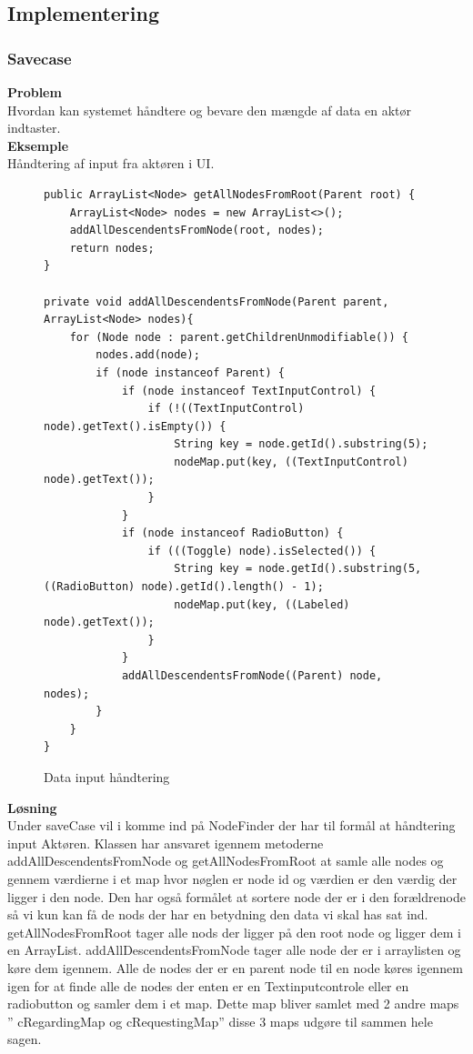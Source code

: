 \subsection{Implementering}
\subsubsection{Savecase}
\textbf{Problem}\\
Hvordan kan systemet håndtere og bevare den mængde af data en aktør indtaster.\\
\textbf{Eksemple} \\
Håndtering af input fra aktøren i UI. \\
\begin{figure} [hbt!]
\begin{lstlisting}
public ArrayList<Node> getAllNodesFromRoot(Parent root) {
	ArrayList<Node> nodes = new ArrayList<>();
	addAllDescendentsFromNode(root, nodes);
	return nodes;
}
    
private void addAllDescendentsFromNode(Parent parent, ArrayList<Node> nodes){
	for (Node node : parent.getChildrenUnmodifiable()) {
		nodes.add(node);
		if (node instanceof Parent) {
			if (node instanceof TextInputControl) {
				if (!((TextInputControl) node).getText().isEmpty()) {
					String key = node.getId().substring(5);
					nodeMap.put(key, ((TextInputControl) node).getText());
				}
			}
			if (node instanceof RadioButton) {
				if (((Toggle) node).isSelected()) {
					String key = node.getId().substring(5,((RadioButton) node).getId().length() - 1);
					nodeMap.put(key, ((Labeled) node).getText());
				}
			}
			addAllDescendentsFromNode((Parent) node, nodes);
		}
    }
}
\end{lstlisting}
\caption{Data input håndtering}
\label{kode:nodes}
\end{figure}
\textbf{Løsning }\\
Under saveCase vil i komme ind på NodeFinder der har til formål at håndtering input Aktøren. Klassen har ansvaret igennem metoderne addAllDescendentsFromNode og getAllNodesFromRoot at samle alle nodes og gennem værdierne i et map hvor nøglen er node id og værdien er den værdig der ligger i den node. Den har også formålet at sortere node der er i den forældrenode så vi kun kan få de nods der har en betydning den data vi skal has sat ind. \\
getAllNodesFromRoot tager alle nods der ligger på den root node og ligger dem i en ArrayList. addAllDescendentsFromNode tager alle node der er i arraylisten og køre dem igennem. Alle de nodes der er en parent node til en node køres igennem igen for at finde alle de nodes der enten er en Textinputcontrole eller en radiobutton og samler dem i et map.  Dette map bliver samlet med 2 andre maps ” cRegardingMap og cRequestingMap” disse 3 maps udgøre til sammen hele sagen.\\
